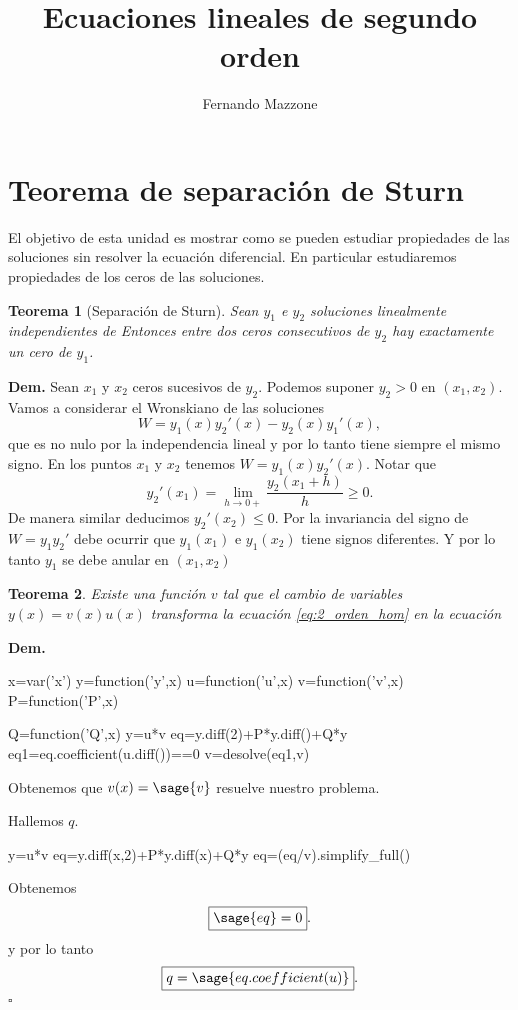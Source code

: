 \documentclass{article}
\title{Ecuaciones lineales de segundo orden}
\author{Fernando Mazzone}
\newtheorem{teorema}{Teorema}[section]
\newcommand{\qed}{$\square$}
\begin{document}
\section{Teorema de separación de Sturn}

El objetivo  de esta unidad es mostrar como se pueden estudiar propiedades de las soluciones sin resolver la ecuación diferencial. En particular estudiaremos propiedades de  los ceros de las soluciones.

\begin{teorema}[Separación de Sturn] Sean $y_1$ e $y_2$ soluciones linealmente independientes de 
Entonces entre dos ceros consecutivos de $y_2$ hay exactamente un cero de $y_1$. \end{teorema}
\textbf{Dem.} Sean $x_1$ y $x_2$ ceros sucesivos de $y_2$. Podemos suponer $y_2>0$ en $(x_1,x_2)$. Vamos a considerar el Wronskiano de las soluciones
\[W=y_1(x)y_2'(x)-y_2(x)y_1'(x),\]
que es no nulo por la independencia lineal y por lo tanto tiene siempre el  mismo signo. En los puntos $x_1$ y $x_2$ tenemos $W=y_1(x)y_2'(x)$. Notar que
\[y_2'(x_1)=\lim_{h\to 0+}\frac{y_2(x_1+h)}{h}\geq 0.\]
De  manera similar deducimos $y_2'(x_2)\leq 0$. Por la invariancia del signo de $W=y_1y_2'$ debe ocurrir que $y_1(x_1)$ e $y_1(x_2)$ tiene signos diferentes. Y por lo tanto $y_1$ se debe anular en $(x_1,x_2)$

\begin{teorema} Existe una función $v$ tal que el cambio de variables $y(x)=v(x)u(x)$ transforma la ecuación \eqref{eq:2_orden_hom} en la ecuación
\end{teorema}
\textbf{Dem.} 
\begin{sageblock}
x=var('x')
y=function('y',x)
u=function('u',x)
v=function('v',x)
P=function('P',x)

Q=function('Q',x)
y=u*v
eq=y.diff(2)+P*y.diff()+Q*y
eq1=eq.coefficient(u.diff())==0
v=desolve(eq1,v)
\end{sageblock}
Obtenemos que $v(x)=\sage{v}$ resuelve nuestro problema.

Hallemos $q$.

\begin{sageblock}
y=u*v
eq=y.diff(x,2)+P*y.diff(x)+Q*y
eq=(eq/v).simplify_full()
\end{sageblock}
Obtenemos
\[\boxed{\sage{eq}=0}.\]
y por lo tanto
\[\boxed{q=\sage{eq.coefficient(u)}}.\]
\qed
\end{document}
